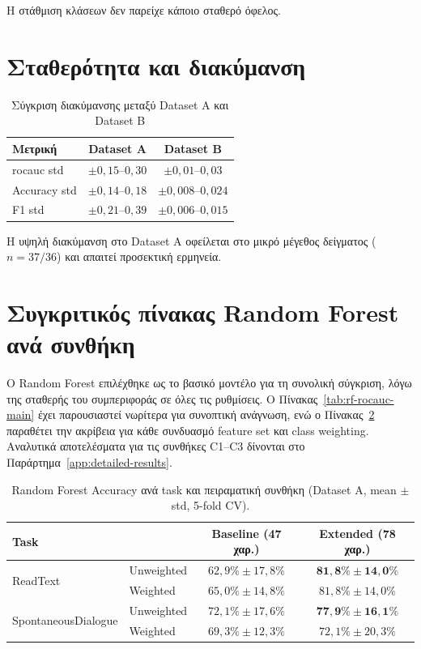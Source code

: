 Η στάθμιση κλάσεων δεν παρείχε κάποιο σταθερό όφελος.

\section{Σταθερότητα και διακύμανση}

\begin{table}[H]
\centering
\begin{tabular}{@{}lcc@{}}
\toprule
\textbf{Μετρική} & \textbf{Dataset A} & \textbf{Dataset B} \\
\midrule
\gls{rocauc} std & $\pm 0{,}15$--$0{,}30$ & $\pm 0{,}01$--$0{,}03$ \\
Accuracy std & $\pm 0{,}14$--$0{,}18$ & $\pm 0{,}008$--$0{,}024$ \\
F1 std & $\pm 0{,}21$--$0{,}39$ & $\pm 0{,}006$--$0{,}015$ \\
\bottomrule
\end{tabular}
\caption{Σύγκριση διακύμανσης μεταξύ Dataset A και Dataset B}
\label{tab:variance-summary}
\end{table}

Η υψηλή διακύμανση στο Dataset A οφείλεται στο μικρό μέγεθος δείγματος ($n=37/36$) και απαιτεί προσεκτική ερμηνεία.

\section{Συγκριτικός πίνακας Random Forest ανά συνθήκη}

Ο Random Forest επιλέχθηκε ως το βασικό μοντέλο για τη συνολική σύγκριση, λόγω της σταθερής του συμπεριφοράς σε όλες τις ρυθμίσεις. 
Ο Πίνακας~\ref{tab:rf-rocauc-main} έχει παρουσιαστεί νωρίτερα για συνοπτική ανάγνωση, 
ενώ ο Πίνακας~\ref{tab:rf-accuracy-main} παραθέτει την ακρίβεια για κάθε συνδυασμό feature set και class weighting. 
Αναλυτικά αποτελέσματα για τις συνθήκες C1--C3 δίνονται στο Παράρτημα~\ref{app:detailed-results}.

\begin{table}[H]
\centering
\caption{Random Forest Accuracy ανά task και πειραματική συνθήκη (Dataset A, mean $\pm$ std, 5-fold CV).}
\label{tab:rf-accuracy-main}
\begin{tabular}{@{}llcc@{}}
\toprule
\textbf{Task} & & \textbf{Baseline (47 χαρ.)} & \textbf{Extended (78 χαρ.)} \\
\midrule
\multirow{2}{*}{ReadText}
& Unweighted & $62{,}9\% \pm 17{,}8\%$ & $\mathbf{81{,}8\% \pm 14{,}0\%}$ \\
& Weighted & $65{,}0\% \pm 14{,}8\%$ & $81{,}8\% \pm 14{,}0\%$ \\
\midrule
\multirow{2}{*}{SpontaneousDialogue}
& Unweighted & $72{,}1\% \pm 17{,}6\%$ & $\mathbf{77{,}9\% \pm 16{,}1\%}$ \\
& Weighted & $69{,}3\% \pm 12{,}3\%$ & $72{,}1\% \pm 20{,}3\%$ \\
\bottomrule
\end{tabular}
\end{table}


